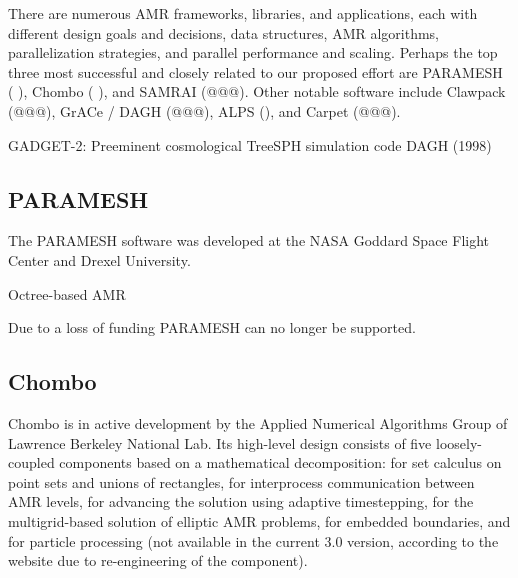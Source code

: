 \documentclass[14pt,letter]{article}
\begin{document}
There are numerous AMR frameworks, libraries, and applications, each
with different design goals and decisions, data structures, AMR
algorithms, parallelization strategies, and parallel performance and
scaling.  Perhaps the top three most successful and closely related to
our proposed effort are PARAMESH (\cite{MaOl00} \nocite{OlMa05}
\nocite{Ol06}), Chombo (\cite{wwwchombo} \cite{CoGr09}), and SAMRAI
(@@@).  Other notable software include Clawpack (@@@), GrACe / DAGH
(@@@), ALPS (\cite{BuBu09}), and Carpet (@@@).


GADGET-2: Preeminent cosmological TreeSPH simulation code
DAGH (1998)

\subsection{PARAMESH}

\nocite{wwwparamesh}
\nocite{MaOl00} %
\nocite{OlMa05}
\nocite{Ol06}

The PARAMESH software was developed at the NASA Goddard Space Flight
Center and Drexel University.

Octree-based AMR


Due to a loss of funding PARAMESH can no longer be supported.

\subsection{Chombo}

\nocite{wwwchombo}
\nocite{CoGr09}

Chombo is in active development by the Applied Numerical Algorithms
Group of Lawrence Berkeley National Lab.  Its high-level design
consists of five loosely-coupled components based on a mathematical
decomposition:  for set calculus on point sets and
unions of rectangles,  for interprocess communication
between AMR levels,  for advancing the solution
using adaptive timestepping,  for the
multigrid-based solution of elliptic AMR problems,  for
embedded boundaries, and  for particle processing
(not available in the current 3.0 version, according to the website
due to re-engineering of the component).
\end{document}

